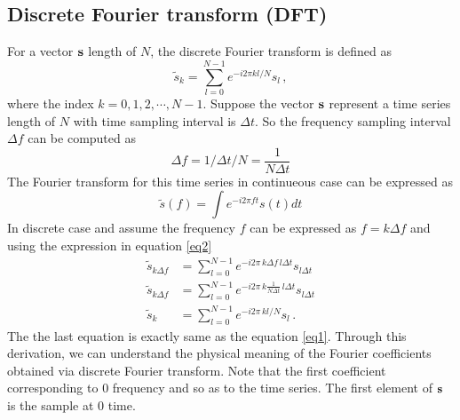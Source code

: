 \documentclass[revised,endfloat]{geophysics}
\begin{document}
\subsection{Discrete Fourier transform (DFT)}
For a vector ${\bf s}$ length of $N$, the discrete Fourier transform is  defined as
\begin{equation}
\tilde{s}_k  = \sum_{l=0}^{N-1} e^{-i 2 \pi k l / N} s_l \,,
\label{eq1}
\end{equation}
where the index $k = 0, 1, 2, \cdots, N-1$. Suppose the vector ${\bf s}$ represent a time series length of $N$ with time sampling interval is $\Delta t$. So the frequency sampling interval $\Delta f$ can be computed as 
\begin{equation}
\Delta f  = 1/ \Delta t / N = \frac{1}{N \Delta t}
\label{eq2}
\end{equation}
The Fourier transform for this time series in continueous case can be expressed as
\begin{equation}
\tilde{s}(f)  = \int e^{-i 2 \pi f t} s(t) dt 
\label{eq3}
\end{equation}
In discrete case and assume the frequency $f$ can be expressed as $f = k \Delta f$ and using the expression in equation \ref{eq2}
\begin{equation}
\begin{split}
\tilde{s}_{k \Delta f}  &= \sum_{l=0}^{N-1} e^{-i 2 \pi \, k \Delta f \,  l \Delta t} s_{l \Delta t}  \\
\tilde{s}_{k \Delta f}  &= \sum_{l=0}^{N-1} e^{-i 2 \pi \, k \frac{1}{N \Delta t} \,  l \Delta t} s_{l \Delta t} \\
\tilde{s}_{k}  &= \sum_{l=0}^{N-1} e^{-i 2 \pi \, k l / N} s_l \,.
\end{split}
\label{eq4}
\end{equation}
The the last equation is exactly same as the equation \ref{eq1}. Through this derivation, we can understand the physical meaning of the Fourier coefficients obtained via discrete Fourier transform. Note that the first coefficient corresponding to $0$ frequency and so as to the time series. The first element of ${\bf s}$ is the sample at $0$ time. 
\end{document}
